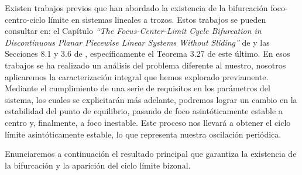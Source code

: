 \documentclass[12pt,a4paper]{report} %
\newcommand{\eref}[1]{\hyperref[#1]{\textcolor{blue}{(\ref*{#1})}}}
\newcommand{\eref}[1]{\hyperref[#1]{\textcolor{blue}{\textit{(\ref*{#1})}}}}
\begin{document}

	
	Existen trabajos previos que han abordado la existencia de la bifurcación foco-centro-ciclo límite en sistemas lineales a trozos. Estos trabajos se pueden consultar en: el Capítulo \textit{``The Focus-Center-Limit Cycle Bifurcation in Discontinuous Planar Piecewise Linear
	Systems Without Sliding''} de \cite{ciclolimite} y las Secciones 8.1 y 3.6 de \cite{amarillo}, específicamente el Teorema 3.27 de este último. En esos trabajos se ha realizado un análisis del problema diferente al nuestro, nosotros aplicaremos la caracterización integral que hemos explorado previamente. Mediante el cumplimiento de una serie de requisitos en los parámetros del sistema, los cuales se explicitarán más adelante, podremos lograr un cambio en la estabilidad del punto de equilibrio, pasando de foco asintóticamente estable a centro y, finalmente, a foco inestable. Este proceso nos llevará a obtener el ciclo límite asintóticamente estable, lo que representa nuestra oscilación periódica.
	
	\vspace{0.5cm} Enunciaremos a continuación el resultado principal que garantiza la existencia de la bifurcación y la aparición del ciclo límite bizonal.
	
\end{document}

